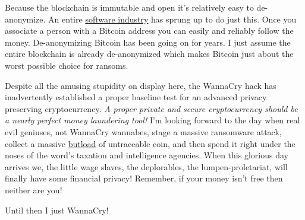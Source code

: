Because the blockchain is immutable and open it's relatively easy to
de-anonymize. An entire
\href{https://www.engadget.com/2016/07/06/startups-seek-to-de-anonymize-bitcoin-to-fight-crime/}{software
industry} has sprung up to do just this. Once you associate a person
with a Bitcoin address you can easily and reliably follow the money.
De-anonymizing Bitcoin has been going on for years. I just assume the
entire blockchain is already de-anonymized which makes Bitcoin just
about the worst possible choice for ransoms.

Despite all the amusing stupidity on display here, the WannaCry hack has
inadvertently established a proper baseline test for an advanced privacy
preserving cryptocurrency. \emph{A proper private and secure
cryptocurrency should be a nearly perfect money laundering tool!} I'm
looking forward to the day when real evil geniuses, not WannaCry
wannabes, stage a massive ransomware attack, collect a massive
\href{http://www.urbandictionary.com/define.php?term=buttload}{butload} of
untraceable coin, and then spend it right under the noses of the word's
taxation and intelligence agencies. When this glorious day arrives we,
the little wage slaves, the deplorables, the lumpen-proletariat, will
finally have some financial privacy! Remember, if your money isn't free
then neither are you!

Until then I just WannaCry!

%
%
%



%
